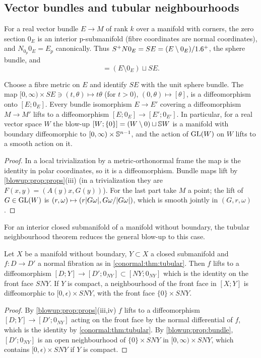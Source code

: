 \subsection{Vector bundles and tubular neighbourhoods}
For a real vector bundle $E\to M$ of rank $k$ over a manifold with corners, the zero
section $0_E$ is an interior p-submanifold (fibre coordinates are normal coordinates),
and $N_{0_p}0_E=E_p$ canonically. Thus $S^+N0_E=SE=(E\setminus0_E)/1.6^+$, the sphere
bundle, and
\begin{equation*}
  [E;0_E]=(E\setminus0_E)\sqcup SE.
\end{equation*}

\begin{proposition}\label{blowup:prop:bundle}
Choose a fibre metric on $E$ and identify $SE$ with the unit sphere bundle. The map
$[0,\infty)\times SE\ni(t,\theta)\mapsto t\theta$ (for $t>0$), $(0,\theta)\mapsto[\theta]$,
is a diffeomorphism onto $[E;0_E]$. Every bundle isomorphism $E\to E'$ covering a
diffeomorphism $M\to M'$ lifts to a diffeomorphism $[E;0_E]\to[E';0_{E'}]$. In
particular, for a real vector space $W$ the blow-up $[W;\{0\}]=(W\setminus0)\sqcup\mathbb{S} W$
is a manifold with boundary diffeomorphic to $[0,\infty)\times\mathbb{S}^{n-1}$, and the action
of $\operatorname{GL}(W)$ on $W$ lifts to a smooth action on it.
\end{proposition}
\begin{proof}
In a local trivialization by a metric-orthonormal frame the map is the identity in polar
coordinates, so it is a diffeomorphism. Bundle maps lift by
\cref{blowup:prop:props}(iii) (in a trivialization they are $F(x,y)=(A(y)x,G(y))$). For
the last part take $M$ a point; the lift of $G\in\operatorname{GL}(W)$ is
$(r,\omega)\mapsto(r\lvert G\omega\rvert,G\omega/\lvert G\omega\rvert)$, which is smooth jointly in
$(G,r,\omega)$.
\end{proof}

For an interior closed submanifold of a manifold without boundary, the tubular
neighbourhood theorem reduces the general blow-up to this case.

\begin{proposition}\label{blowup:prop:tubular}
Let $X$ be a manifold without boundary, $Y\subset X$ a closed submanifold and $f:D\to D'$
a normal fibration as in \cref{conormal:thm:tubular}. Then $f$ lifts to a diffeomorphism
$[D;Y]\to[D';0_{NY}]\subset[NY;0_{NY}]$ which is the identity on the front face
$SNY$. If $Y$ is compact, a neighbourhood of the front face in $[X;Y]$ is
diffeomorphic to $[0,\epsilon)\times SNY$, with the front face $\{0\}\times SNY$.
\end{proposition}
\begin{proof}
By \cref{blowup:prop:props}(iii,iv) $f$ lifts to a diffeomorphism $[D;Y]\to[D';0_{NY}]$
acting on the front face by the normal differential of $f$, which is the identity by
\cref{conormal:thm:tubular}. By \cref{blowup:prop:bundle}, $[D';0_{NY}]$ is an open
neighbourhood of $\{0\}\times SNY$ in $[0,\infty)\times SNY$, which contains
$[0,\epsilon)\times SNY$ if $Y$ is compact.
\end{proof}

